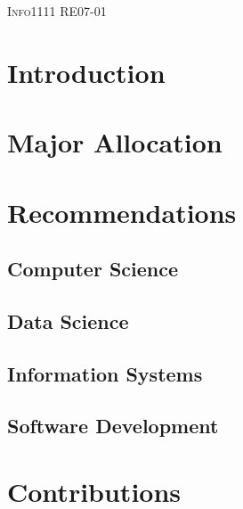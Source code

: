 \documentclass[12pt, a4paper]{article}
\begin{document}
	\begin{titlepage}
		\begin{center}

			\begin{center}
				\begin{large}
					\begin{tabular}{cc}

					\end{tabular}
				\end{large}
			\end{center}
			
			\textsc{\large Info1111 RE07-01}

			
		\end{center}
	\end{titlepage}
		
	\clearpage

	\tableofcontents

	\clearpage
	\setcounter{page}{1}
	

	\section{Introduction}

	\clearpage
	
	\section{Major Allocation}

	\clearpage
	
	\section{Recommendations}
	\subsection{Computer Science}

	\clearpage
	
	\subsection{Data Science}

	\clearpage
	
	\subsection{Information Systems}

	\clearpage
	
	\subsection{Software Development}

	\clearpage

	\section{Contributions}

	\clearpage
	

	
	
	
\end{document}
